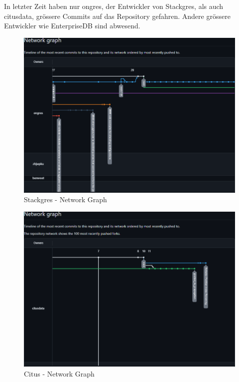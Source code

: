 \begin{flushleft}
    In letzter Zeit haben nur ongres, der Entwickler von Stackgres, als auch citusdata, grössere Commits auf das Repository gefahren.
    Andere grössere Entwickler wie EnterpriseDB sind abwesend.
    \begin{figure}[H]
        \centering
        \includegraphics[width=0.75\linewidth]{source/implementation/evaluation/postgresql_ha_solutions/insights/stackgres_citus/network_graph_ongres_stackgres}
        \caption{Stackgres - Network Graph}
        \label{fig:network_graph_ongres_stackgres}
    \end{figure}
    \begin{figure}[H]
        \centering
        \includegraphics[width=0.75\linewidth]{source/implementation/evaluation/postgresql_ha_solutions/insights/stackgres_citus/network_graph_citusdata_citus}
        \caption{Citus - Network Graph}
        \label{fig:network_graph_citusdata_citus}
    \end{figure}

\end{flushleft}